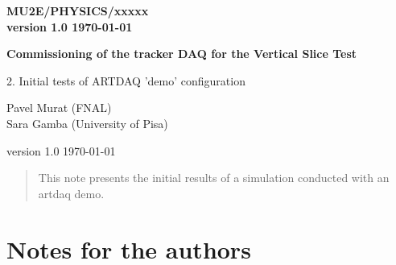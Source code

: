 \documentclass[12pt]{article}
\begin{document}
\begin{titlepage}
  \begin{flushright}
    \bf {MU2E/PHYSICS/xxxxx} \\
    version 1.0
    \today
 \end{flushright}

  \vspace{1cm}

  \begin{center}
    {\Large \bf Commissioning of the tracker DAQ for the Vertical Slice Test

      \vspace{0.3in}

      2. Initial tests of ARTDAQ 'demo' configuration
    }

    \vspace{1cm}
    Pavel Murat (FNAL) \\
    Sara Gamba (University of Pisa)

   
    version 1.0
    \today
 \end{center}

  \begin{abstract}
    This note presents the initial results of a simulation conducted with an artdaq demo.
    \vspace{0.2in}
  \end{abstract}

\end{titlepage}
%
%
%
{\tableofcontents}
% 

\newpage

\section {Notes for the authors}
\end{document}
